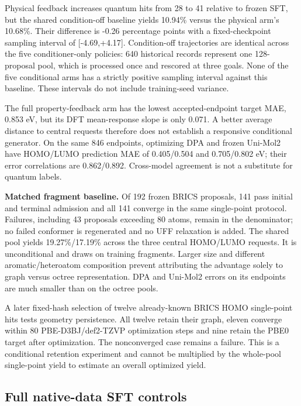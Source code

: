 \documentclass[11pt,a4paper]{article}
\begin{document}
Physical feedback increases quantum hits from 28 to 41 relative to
frozen SFT, but the shared condition-off baseline yields 10.94\% versus
the physical arm's 10.68\%. Their difference is -0.26 percentage points
with a fixed-checkpoint sampling interval of {[}-4.69,+4.17{]}.
Condition-off trajectories are identical across the five
conditioner-only policies: 640 historical records represent one
128-proposal pool, which is processed once and rescored at three goals.
None of the five conditional arms has a strictly positive sampling
interval against this baseline. These intervals do not include
training-seed variance.

The full property-feedback arm has the lowest accepted-endpoint target
MAE, 0.853 eV, but its DFT mean-response slope is only 0.071. A better
average distance to central requests therefore does not establish a
responsive conditional generator. On the same 846 endpoints, optimizing
DPA and frozen Uni-Mol2 have HOMO/LUMO prediction MAE of 0.405/0.504 and
0.705/0.802 eV; their error correlations are 0.862/0.892. Cross-model
agreement is not a substitute for quantum labels.

\textbf{Matched fragment baseline.} Of 192 frozen BRICS proposals, 141
pass initial and terminal admission and all 141 converge in the same
single-point protocol. Failures, including 43 proposals exceeding 80
atoms, remain in the denominator; no failed conformer is regenerated and
no UFF relaxation is added. The shared pool yields 19.27\%/17.19\%
across the three central HOMO/LUMO requests. It is unconditional and
draws on training fragments. Larger size and different
aromatic/heteroatom composition prevent attributing the advantage solely
to graph versus octree representation. DPA and Uni-Mol2 errors on its
endpoints are much smaller than on the octree pools.

A later fixed-hash selection of twelve already-known BRICS HOMO
single-point hits tests geometry persistence. All twelve retain their
graph, eleven converge within 80 PBE-D3BJ/def2-TZVP optimization steps
and nine retain the PBE0 target after optimization. The nonconverged
case remains a failure. This is a conditional retention experiment and
cannot be multiplied by the whole-pool single-point yield to estimate an
overall optimized yield.

\FloatBarrier
\subsection{Full native-data SFT
controls}\label{full-native-data-sft-controls}
\end{document}
